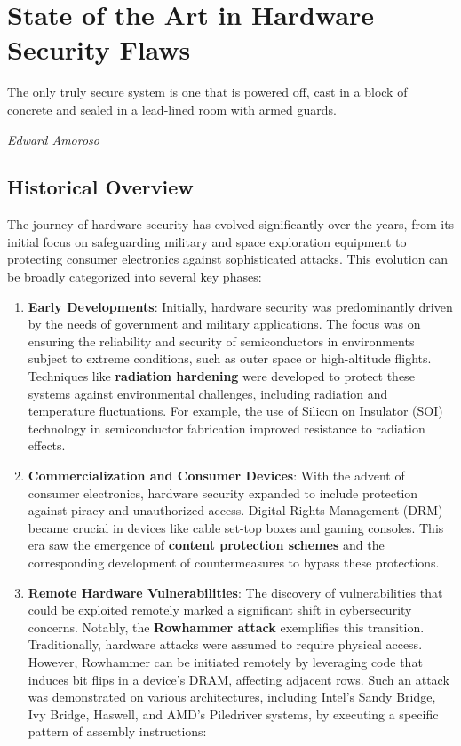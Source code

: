 \chapter{State of the Art in Hardware Security Flaws}
\epigraph{The only truly secure system is one that is powered off, cast in a block of concrete and sealed in a lead-lined room with armed guards.}{\textit{Edward Amoroso}}

\hypertarget{historical-overview}{%
\section{Historical Overview}\label{historical-overview}}

The journey of hardware security has evolved significantly over the
years, from its initial focus on safeguarding military and space
exploration equipment to protecting consumer electronics against
sophisticated attacks. This evolution can be broadly categorized into
several key phases:

\begin{enumerate}
\def\labelenumi{\arabic{enumi}.}
\item
  \textbf{Early Developments}: Initially, hardware security was
  predominantly driven by the needs of government and military
  applications. The focus was on ensuring the reliability and security
  of semiconductors in environments subject to extreme conditions, such
  as outer space or high-altitude flights. Techniques like
  \textbf{radiation hardening}\cite{RadiationHardening2024} were developed to protect these systems
  against environmental challenges, including radiation and temperature
  fluctuations. For example, the
  use of Silicon on Insulator (SOI) technology in semiconductor
  fabrication improved resistance to radiation effects.
\item
  \textbf{Commercialization and Consumer Devices}: With the advent of
  consumer electronics, hardware security expanded to include protection
  against piracy and unauthorized access. Digital Rights Management
  (DRM) became crucial in devices like cable set-top boxes and gaming
  consoles. This era saw the emergence of \textbf{content protection
  schemes} and the corresponding development of countermeasures to
  bypass these protections.\cite{DigitalRightsManagement2024}
\item
  \textbf{Remote Hardware Vulnerabilities}: The discovery of
  vulnerabilities that could be exploited remotely marked a significant
  shift in cybersecurity concerns. Notably, the \textbf{Rowhammer
  attack}\cite{RowHammer2024} exemplifies this transition. Traditionally, hardware attacks
  were assumed to require physical access. However, Rowhammer can be
  initiated remotely by leveraging code that induces bit flips in a
  device's DRAM, affecting adjacent rows. Such an attack was
  demonstrated on various architectures, including Intel's Sandy Bridge,
  Ivy Bridge, Haswell, and AMD's Piledriver systems, by executing a
  specific pattern of assembly instructions:
\end{enumerate}

